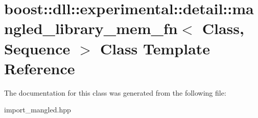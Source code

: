 \hypertarget{a01672}{}\section{boost\+:\+:dll\+:\+:experimental\+:\+:detail\+:\+:mangled\+\_\+library\+\_\+mem\+\_\+fn$<$ Class, Sequence $>$ Class Template Reference}
\label{a01672}


The documentation for this class was generated from the following file\+:\begin{DoxyCompactItemize}
\item 
import\+\_\+mangled.\+hpp\end{DoxyCompactItemize}
